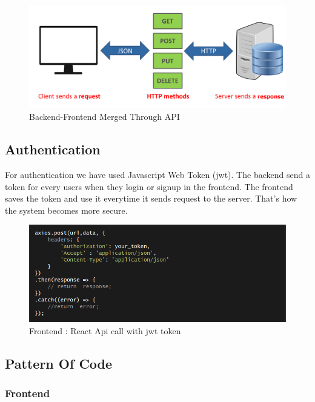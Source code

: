 \documentclass[10pt]{article}
\begin{document}
\begin{figure}[H]
  \centering
  \centerline{\includegraphics[width=\textwidth]{diagram/api.png}}
  \caption{Backend-Frontend Merged Through API}
  \label{fig}
\end{figure}


\subsection{Authentication}

For authentication we have used Javascript Web Token (jwt). The backend send a token for every users when they login or signup in the frontend. The frontend saves the token and use it everytime it sends request to the server. That's how the system becomes more secure.

\begin{figure}[H]
  \centering
  \centerline{\includegraphics[width=\textwidth]{api-call.png}}
  \caption{Frontend : React Api call with jwt token}
  \label{fig}
\end{figure}

\subsection{Pattern Of Code}

\subsubsection{Frontend}
\end{document}
